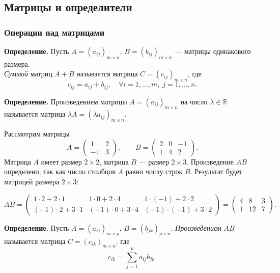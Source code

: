 \documentclass[12pt, a4paper]{article}
\newcommand{\R}{\mathbb{R}}
\begin{document}
\subsection{Матрицы и определители}
\subsubsection{Операции над матрицами}
\begin{tcolorbox}
\textbf{Определение.} Пусть $A = (a_{ij})_{m\times n}$, $B = (b_{ij})_{m\times n}$ — матрицы одинакового размера.  \\
\textit{Суммой} матриц $A + B$ называется матрица $C = (c_{ij})_{m\times n}$, где
\[
c_{ij} = a_{ij} + b_{ij},\quad \forall i = 1,\dots,m,\; j = 1,\dots,n.
\]
\end{tcolorbox}

\begin{tcolorbox}
\textbf{Определение.} Произведением матрицы $A = (a_{ij})_{m\times n}$ на число $\lambda \in \R$ называется матрица $\lambda A = (\lambda a_{ij})_{m\times n}$.
\end{tcolorbox}

\begin{tcolorbox}[title=Пример умножения матриц]
Рассмотрим матрицы
\[
A = \begin{pmatrix}
1 & 2 \\
-1 & 3
\end{pmatrix}, \qquad
B = \begin{pmatrix}
2 & 0 & -1 \\
1 & 4 & 2
\end{pmatrix}.
\]
Матрица \(A\) имеет размер \(2 \times 2\), матрица \(B\) — размер \(2 \times 3\).  
Произведение \(AB\) определено, так как число столбцов \(A\) равно числу строк \(B\). Результат будет матрицей размера \(2 \times 3\):

\[
AB =
\begin{pmatrix}
1\cdot2 + 2\cdot1 & 1\cdot0 + 2\cdot4 & 1\cdot(-1) + 2\cdot2 \\
(-1)\cdot2 + 3\cdot1 & (-1)\cdot0 + 3\cdot4 & (-1)\cdot(-1) + 3\cdot2
\end{pmatrix}
=
\begin{pmatrix}
4 & 8 & 3 \\
1 & 12 & 7
\end{pmatrix}.
\]
\end{tcolorbox}

\begin{tcolorbox}
\textbf{Определение.} Пусть $A = (a_{ij})_{m\times p}$, $B = (b_{jk})_{p\times n}$.  
\textit{Произведением} $AB$ называется матрица $C = (c_{ik})_{m\times n}$, где
\[
c_{ik} = \sum_{j=1}^{p} a_{ij} b_{jk}.
\]
\end{tcolorbox}
\end{document}
